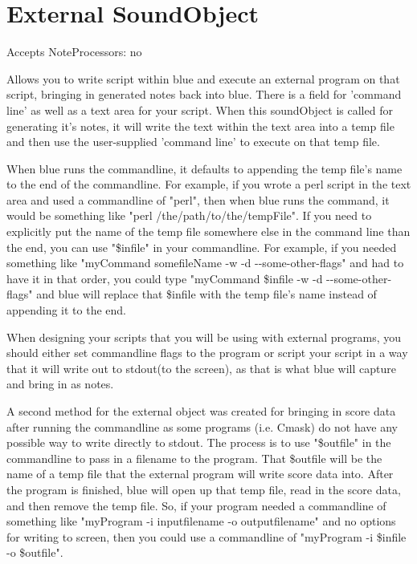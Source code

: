 \section{External SoundObject}\label{externalSoundObject}

Accepts NoteProcessors: no

Allows you to write script within blue and execute an external program
on that script, bringing in generated notes back into blue. There is a
field for 'command line' as well as a text area for your script. When
this soundObject is called for generating it's notes, it will write the
text within the text area into a temp file and then use the
user-supplied 'command line' to execute on that temp file.

When blue runs the commandline, it defaults to appending the temp file's
name to the end of the commandline. For example, if you wrote a perl
script in the text area and used a commandline of "perl", then when blue
runs the command, it would be something like "perl
/the/path/to/the/tempFile". If you need to explicitly put the name of
the temp file somewhere else in the command line than the end, you can
use "\$infile" in your commandline. For example, if you needed something
like "myCommand somefileName -w -d -\/-some-other-flags" and had to have
it in that order, you could type "myCommand \$infile -w -d
-\/-some-other-flags" and blue will replace that \$infile with the temp
file's name instead of appending it to the end.

When designing your scripts that you will be using with external
programs, you should either set commandline flags to the program or
script your script in a way that it will write out to stdout(to the
screen), as that is what blue will capture and bring in as notes.

A second method for the external object was created for bringing in
score data after running the commandline as some programs (i.e. Cmask)
do not have any possible way to write directly to stdout. The process is
to use "\$outfile" in the commandline to pass in a filename to the
program. That \$outfile will be the name of a temp file that the
external program will write score data into. After the program is
finished, blue will open up that temp file, read in the score data, and
then remove the temp file. So, if your program needed a commandline of
something like "myProgram -i inputfilename -o outputfilename" and no
options for writing to screen, then you could use a commandline of
"myProgram -i \$infile -o \$outfile".

